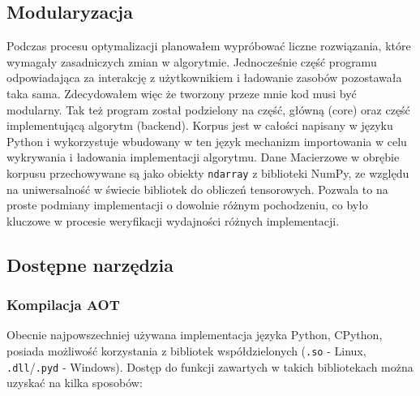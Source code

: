 \documentclass[12pt, a4paper]{article}
\newcommand{\code}[1]{\texttt{#1}}
\begin{document}
\begin{sloppypar}


    \subsection{Modularyzacja}


    Podczas procesu optymalizacji planowałem wypróbować liczne rozwiązania, które
    wymagały zasadniczych zmian w algorytmie. Jednocześnie część programu odpowiadająca za
    interakcję z użytkownikiem i ładowanie zasobów pozostawała taka sama. Zdecydowałem
    więc że tworzony przeze mnie kod musi być modularny. Tak też program został podzielony
    na część, główną (core) oraz część implementującą algorytm (backend). Korpus jest w całości
    napisany w języku Python i wykorzystuje wbudowany w ten język mechanizm importowania
    w celu wykrywania i ładowania implementacji algorytmu. Dane Macierzowe w obrębie
    korpusu przechowywane są jako obiekty \code{ndarray} z biblioteki NumPy, ze względu
    na uniwersalność w świecie bibliotek do obliczeń tensorowych. Pozwala to na proste podmiany
    implementacji o dowolnie różnym pochodzeniu, co było kluczowe w procesie weryfikacji
    wydajności różnych implementacji.

    \subsection{Dostępne narzędzia}


    \subsubsection{Kompilacja AOT}



    Obecnie najpowszechniej używana implementacja języka Python, CPython, posiada możliwość
    korzystania z bibliotek współdzielonych (\code{.so} - Linux, \code{.dll}/\code{.pyd}
    - Windows). Dostęp do funkcji zawartych w takich bibliotekach można uzyskać na kilka
    sposobów:


\end{sloppypar}
\end{document}
